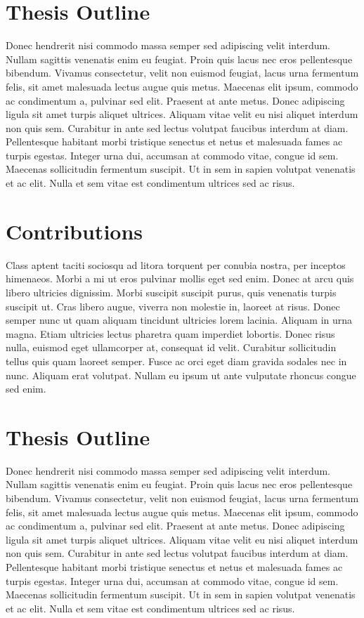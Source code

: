 \section{Thesis Outline}

Donec hendrerit nisi commodo massa semper sed adipiscing velit interdum. Nullam sagittis venenatis enim eu feugiat. Proin quis lacus nec eros pellentesque bibendum. Vivamus consectetur, velit non euismod feugiat, lacus urna fermentum felis, sit amet malesuada lectus augue quis metus. Maecenas elit ipsum, commodo ac condimentum a, pulvinar sed elit. Praesent at ante metus. Donec adipiscing ligula sit amet turpis aliquet ultrices. Aliquam vitae velit eu nisi aliquet interdum non quis sem. Curabitur in ante sed lectus volutpat faucibus interdum at diam. Pellentesque habitant morbi tristique senectus et netus et malesuada fames ac turpis egestas. Integer urna dui, accumsan at commodo vitae, congue id sem. Maecenas sollicitudin fermentum suscipit. Ut in sem in sapien volutpat venenatis et ac elit. Nulla et sem vitae est condimentum ultrices sed ac risus.


\section{Contributions}

Class aptent taciti sociosqu ad litora torquent per conubia nostra, per inceptos himenaeos. Morbi a mi ut eros pulvinar mollis eget sed enim. Donec at arcu quis libero ultricies dignissim. Morbi suscipit suscipit purus, quis venenatis turpis suscipit ut. Cras libero augue, viverra non molestie in, laoreet at risus. Donec semper nunc ut quam aliquam tincidunt ultricies lorem lacinia. Aliquam in urna magna. Etiam ultricies lectus pharetra quam imperdiet lobortis. Donec risus nulla, euismod eget ullamcorper at, consequat id velit. Curabitur sollicitudin tellus quis quam laoreet semper. Fusce ac orci eget diam gravida sodales nec in nunc. Aliquam erat volutpat. Nullam eu ipsum ut ante vulputate rhoncus congue sed enim.

\section{Thesis Outline}

Donec hendrerit nisi commodo massa semper sed adipiscing velit interdum. Nullam sagittis venenatis enim eu feugiat. Proin quis lacus nec eros pellentesque bibendum. Vivamus consectetur, velit non euismod feugiat, lacus urna fermentum felis, sit amet malesuada lectus augue quis metus. Maecenas elit ipsum, commodo ac condimentum a, pulvinar sed elit. Praesent at ante metus. Donec adipiscing ligula sit amet turpis aliquet ultrices. Aliquam vitae velit eu nisi aliquet interdum non quis sem. Curabitur in ante sed lectus volutpat faucibus interdum at diam. Pellentesque habitant morbi tristique senectus et netus et malesuada fames ac turpis egestas. Integer urna dui, accumsan at commodo vitae, congue id sem. Maecenas sollicitudin fermentum suscipit. Ut in sem in sapien volutpat venenatis et ac elit. Nulla et sem vitae est condimentum ultrices sed ac risus.

